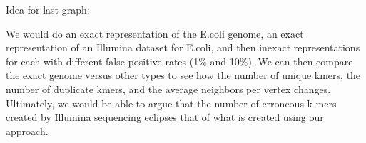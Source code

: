 \documentclass[12pt]{article} \usepackage{simplemargins}
\begin{document}
Idea for last graph:

We would do an exact representation of the E.coli genome, an exact 
representation of an Illumina dataset for E.coli, and then inexact
representations for each with different false positive rates (1\% and
10\%). We can then compare the exact genome versus other types to see
how the number of unique kmers, the number of duplicate kmers, and the
average neighbors per vertex changes. Ultimately, we would be able to
argue that the number of erroneous k-mers created by Illumina
sequencing eclipses that of what is created using our approach.
\end{document}
